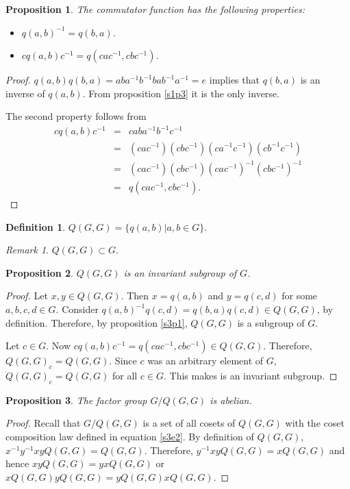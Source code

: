 \documentclass{article}
\theoremstyle{plain}
\numberwithin{thm}{section}
\theoremstyle{plain}
\newtheorem{prop}{Proposition}
\numberwithin{prop}{section}
\theoremstyle{definition}
\newtheorem{defn}{Definition}
\numberwithin{defn}{section}
\theoremstyle{remark}
\newtheorem*{rem}{Remark}
\numberwithin{equation}{section}
\begin{document}
\begin{prop}\label{s5p2}
The commutator function has the following properties:
\begin{itemize}
\item $q(a, b)^{-1} = q(b, a)$.
\item $cq(a, b)c^{-1} = q(cac^{-1}, cbc^{-1})$.
\end{itemize}
\end{prop}
\begin{proof}
$q(a, b)q(b, a) = aba^{-1}b^{-1}bab^{-1}a^{-1} = e$ implies that $q(b, a)$
is an inverse of $q(a, b)$. From proposition \eqref{s1p3} it is the only
inverse.

The second property follows from 
\begin{eqnarray*}
cq(a, b)c^{-1} &=& caba^{-1}b^{-1}c^{-1} \\
 &=& (cac^{-1})(cbc^{-1})(ca^{-1}c^{-1})(cb^{-1}c^{-1}) \\
 &=& (cac^{-1})(cbc^{-1})(cac^{-1})^{-1}(cbc^{-1})^{-1} \\
 &=& q(cac^{-1}, cbc^{-1}).
\end{eqnarray*}
\end{proof}

\begin{defn}\label{s5d2}
$Q(G, G) = \{q(a, b) | a, b \in G\}$.
\end{defn}

\begin{rem}
$Q(G,G) \subset G$.
\end{rem}

\begin{prop}\label{s5p3}
$Q(G, G)$ is an invariant subgroup of $G$.
\end{prop}
\begin{proof}
Let $x, y \in Q(G, G)$. Then $x = q(a, b)$ and $y = q(c, d)$ for some $a, b,
c, d \in G$. Consider $q(a, b)^{-1}q(c, d) = q(b, a)q(c, d) \in Q(G, G)$, by
definition. Therefore, by proposition \ref{s3p1}, $Q(G, G)$ is a subgroup of
$G$.

Let $c \in G$. Now $cq(a, b)c^{-1} = q(cac^{-1}, cbc^{-1}) \in Q(G, G)$. 
Therefore, $Q(G, G)_c = Q(G, G)$. Since $c$ was an arbitrary element of $G$,
$Q(G, G)_c = Q(G, G)$ for all $c \in G$. This makes is an invariant subgroup.
\end{proof}

\begin{prop}\label{s5p4}
The factor group $G/Q(G, G)$ is abelian.
\end{prop}
\begin{proof}
Recall that $G/Q(G, G)$ is a set of all cosets of $Q(G, G)$ with the coset
composition law defined in equation \eqref{s3e2}. By definition of $Q(G, G)$,
$x^{-1}y^{-1}xyQ(G, G) = Q(G, G)$. Therefore, $y^{-1}xyQ(G, G) = xQ(G, G)$ and
hence $xyQ(G, G) = yxQ(G, G)$ or $xQ(G, G) yQ(G, G) = yQ(G, G) xQ(G, G)$.
\end{proof}
\end{document}
